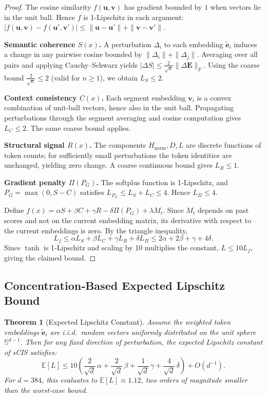 \documentclass[11pt]{article}
\newtheorem{theorem}{Theorem}
\theoremstyle{definition}
\begin{document}
\begin{proof}
The cosine similarity \(f(\mathbf{u},\mathbf{v})\) has gradient bounded by \(1\) when vectors lie in the unit ball. Hence \(f\) is 1‑Lipschitz in each argument: \(|f(\mathbf{u},\mathbf{v})-f(\mathbf{u}',\mathbf{v}')|\le \|\mathbf{u}-\mathbf{u}'\|+\|\mathbf{v}-\mathbf{v}'\|\).

\textbf{Semantic coherence \(S(x)\).} A perturbation \(\Delta_i\) to each embedding \(\tilde{\mathbf{e}}_i\) induces a change in any pairwise cosine bounded by \(\|\Delta_i\|+\|\Delta_j\|\). Averaging over all pairs and applying Cauchy–Schwarz yields \(|\Delta S| \le \frac{2}{\sqrt{n}}\|\Delta\mathbf{E}\|_F\). Using the coarse bound \(\frac{2}{\sqrt{n}}\le 2\) (valid for \(n\ge 1\)), we obtain \(L_S \le 2\).

\textbf{Context consistency \(C(x)\).} Each segment embedding \(\mathbf{v}_i\) is a convex combination of unit‑ball vectors, hence also in the unit ball. Propagating perturbations through the segment averaging and cosine computation gives \(L_C \le 2\). The same coarse bound applies.

\textbf{Structural signal \(R(x)\).} The components \(H_{\text{norm}}, D, L\) are discrete functions of token counts; for sufficiently small perturbations the token identities are unchanged, yielding zero change. A coarse continuous bound gives \(L_R \le 1\).

\textbf{Gradient penalty \(\Pi(P_G)\).} The softplus function is 1‑Lipschitz, and \(P_G = \max(0, S - C)\) satisfies \(L_{P_G} \le L_S + L_C \le 4\). Hence \(L_\Pi \le 4\).

Define \(f(x)=\alpha S+\beta C+\gamma R-\delta\Pi(P_G)+\lambda M_t\). Since \(M_t\) depends on past scores and not on the current embedding matrix, its derivative with respect to the current embeddings is zero. By the triangle inequality,
\[
L_f \le \alpha L_S + \beta L_C + \gamma L_R + \delta L_\Pi \le 2\alpha + 2\beta + \gamma + 4\delta.
\]
Since \(\tanh\) is 1‑Lipschitz and scaling by 10 multiplies the constant, \(L \le 10 L_f\), giving the claimed bound.
\end{proof}

\subsection{Concentration‑Based Expected Lipschitz Bound}

\begin{theorem}[Expected Lipschitz Constant]\label{thm:expected}
Assume the weighted token embeddings \(\tilde{\mathbf{e}}_i\) are i.i.d.\ random vectors uniformly distributed on the unit sphere \(\mathbb{S}^{d-1}\). Then for any fixed direction of perturbation, the expected Lipschitz constant of sCIS satisfies:
\[
\mathbb{E}[L] \le 10 \left( \frac{2}{\sqrt{d}}\,\alpha + \frac{2}{\sqrt{d}}\,\beta + \frac{1}{\sqrt{d}}\,\gamma + \frac{4}{\sqrt{d}}\,\delta \right) + O(d^{-1}).
\]
For \(d=384\), this evaluates to \(\mathbb{E}[L] \approx 1.12\), two orders of magnitude smaller than the worst‑case bound.
\end{theorem}
\end{document}
